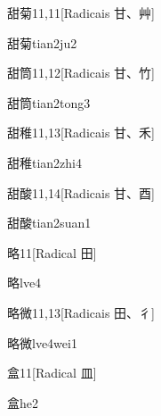 \begin{entry}{甜菊}{11,11}[Radicais ⽢、⾋]
  \begin{phonetics}{甜菊}{tian2ju2}
  \end{phonetics}
\end{entry}

\begin{entry}{甜筒}{11,12}[Radicais ⽢、⽵]
  \begin{phonetics}{甜筒}{tian2tong3}
  \end{phonetics}
\end{entry}

\begin{entry}{甜稚}{11,13}[Radicais ⽢、⽲]
  \begin{phonetics}{甜稚}{tian2zhi4}
  \end{phonetics}
\end{entry}

\begin{entry}{甜酸}{11,14}[Radicais ⽢、⾣]
  \begin{phonetics}{甜酸}{tian2suan1}
  \end{phonetics}
\end{entry}

\begin{entry}{略}{11}[Radical ⽥]
  \begin{phonetics}{略}{lve4}
  \end{phonetics}
\end{entry}

\begin{entry}{略微}{11,13}[Radicais ⽥、⼻]
  \begin{phonetics}{略微}{lve4wei1}
  \end{phonetics}
\end{entry}

\begin{entry}{盒}{11}[Radical ⽫]
  \begin{phonetics}{盒}{he2}
  \end{phonetics}
\end{entry}

